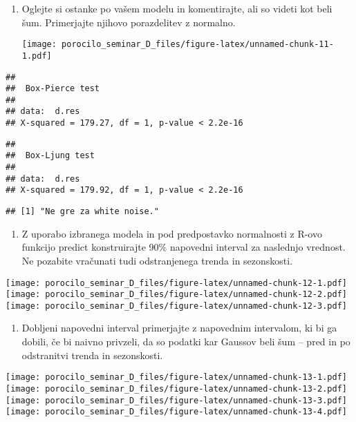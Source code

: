 \documentclass[
]{article}
\providecommand{\tightlist}{%
  \setlength{\itemsep}{0pt}\setlength{\parskip}{0pt}}
\begin{document}
\begin{enumerate}
\def\labelenumi{\arabic{enumi}.}
\setcounter{enumi}{6}
\tightlist
\item
  Oglejte si ostanke po vašem modelu in komentirajte, ali so videti kot
  beli šum. Primerjajte njihovo porazdelitev z normalno.

  \texttt{[image: porocilo\_seminar\_D\_files/figure-latex/unnamed-chunk-11-1.pdf]}
\end{enumerate}

\begin{verbatim}
## 
##  Box-Pierce test
## 
## data:  d.res
## X-squared = 179.27, df = 1, p-value < 2.2e-16
\end{verbatim}

\begin{verbatim}
## 
##  Box-Ljung test
## 
## data:  d.res
## X-squared = 179.92, df = 1, p-value < 2.2e-16
\end{verbatim}

\begin{verbatim}
## [1] "Ne gre za white noise."
\end{verbatim}

\begin{enumerate}
\def\labelenumi{\arabic{enumi}.}
\setcounter{enumi}{7}
\tightlist
\item
  Z uporabo izbranega modela in pod predpostavko normalnosti z R-ovo
  funkcijo predict konstruirajte 90\% napovedni interval za naslednjo
  vrednost. Ne pozabite vračunati tudi odstranjenega trenda in
  sezonskosti.
\end{enumerate}

\texttt{[image: porocilo\_seminar\_D\_files/figure-latex/unnamed-chunk-12-1.pdf]}
\texttt{[image: porocilo\_seminar\_D\_files/figure-latex/unnamed-chunk-12-2.pdf]}
\texttt{[image: porocilo\_seminar\_D\_files/figure-latex/unnamed-chunk-12-3.pdf]}

\begin{enumerate}
\def\labelenumi{\arabic{enumi}.}
\setcounter{enumi}{8}
\tightlist
\item
  Dobljeni napovedni interval primerjajte z napovednim intervalom, ki bi
  ga dobili, če bi naivno privzeli, da so podatki kar Gaussov beli šum
  -- pred in po odstranitvi trenda in sezonskosti.
\end{enumerate}

\texttt{[image: porocilo\_seminar\_D\_files/figure-latex/unnamed-chunk-13-1.pdf]}
\texttt{[image: porocilo\_seminar\_D\_files/figure-latex/unnamed-chunk-13-2.pdf]}
\texttt{[image: porocilo\_seminar\_D\_files/figure-latex/unnamed-chunk-13-3.pdf]}
\texttt{[image: porocilo\_seminar\_D\_files/figure-latex/unnamed-chunk-13-4.pdf]}
\end{document}
